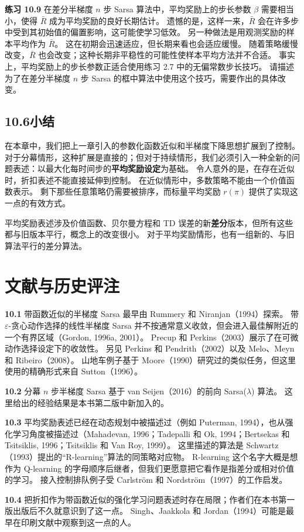 \documentclass[UTF8, 12pt, fontset=fandol, oneside]{ctexart}
\begin{document}
\noindent\textbf{练习 10.9}
在差分半梯度 $n$ 步 Sarsa 算法中，平均奖励上的步长参数 $\beta$ 需要相当小，使得 $\bar R$ 成为平均奖励的良好长期估计。
遗憾的是，这样一来，$\bar R$ 会在许多步中受到其初始值的偏置影响，这可能使学习低效。
另一种做法是用观测奖励的样本平均作为 $\bar R$。
这在初期会迅速适应，但长期来看也会适应缓慢。
随着策略缓慢改变，$\bar R$ 也会改变；这种长期非平稳性的可能性使样本平均方法并不合适。
事实上，平均奖励上的步长参数正适合使用练习 2.7 中的无偏常数步长技巧。
请描述为了在差分半梯度 $n$ 步 Sarsa 的框中算法中使用这个技巧，需要作出的具体改变。

\subsection*{10.6\quad 小结}

在本章中，我们把上一章引入的参数化函数近似和半梯度下降思想扩展到了控制。
对于分幕情形，这种扩展是直接的；但对于持续情形，我们必须引入一种全新的问题表述：以最大化每时间步的\textbf{平均奖励设定}为基础。
令人意外的是，在存在近似时，折扣表述不能直接延伸到控制。
在近似情形中，多数策略不能由一个价值函数表示。
剩下那些任意策略仍需要被排序，而标量平均奖励 $r(\pi)$ 提供了实现这一点的有效方式。

平均奖励表述涉及价值函数、贝尔曼方程和 TD 误差的新\textbf{差分}版本，但所有这些都与旧版本平行，概念上的改变很小。
对于平均奖励情形，也有一组新的、与旧算法平行的差分算法。

\section*{文献与历史评注}

\noindent\textbf{10.1}
带函数近似的半梯度 Sarsa 最早由 Rummery 和 Niranjan（1994）探索。
带 $\varepsilon$-贪心动作选择的线性半梯度 Sarsa 并不按通常意义收敛，但会进入最佳解附近的一个有界区域（Gordon, 1996a, 2001）。
Precup 和 Perkins（2003）展示了在可微动作选择设定下的收敛性。
另见 Perkins 和 Pendrith（2002）以及 Melo、Meyn 和 Ribeiro（2008）。
山地车例子基于 Moore（1990）研究过的类似任务，但这里使用的精确形式来自 Sutton（1996）。

\noindent\textbf{10.2}
分幕 $n$ 步半梯度 Sarsa 基于 van Seijen（2016）的前向 Sarsa($\lambda$) 算法。
这里给出的经验结果是本书第二版中新加入的。

\noindent\textbf{10.3}
平均奖励表述已经在动态规划中被描述过（例如 Puterman, 1994），也从强化学习角度被描述过（Mahadevan, 1996；Tadepalli 和 Ok, 1994；Bertsekas 和 Tsitsiklis, 1996；Tsitsiklis 和 Van Roy, 1999）。
这里描述的算法是 Schwartz（1993）提出的“R-learning”算法的同策略对应物。
R-learning 这个名字大概是想作为 Q-learning 的字母顺序后继者，但我们更愿意把它看作是指差分或相对价值的学习。
接入控制排队例子受 Carlström 和 Nordström（1997）的工作启发。

\noindent\textbf{10.4}
把折扣作为带函数近似的强化学习问题表述时存在局限；作者们在本书第一版出版后不久就意识到了这一点。
Singh、Jaakkola 和 Jordan（1994）可能是最早在印刷文献中观察到这一点的人。
\end{document}
